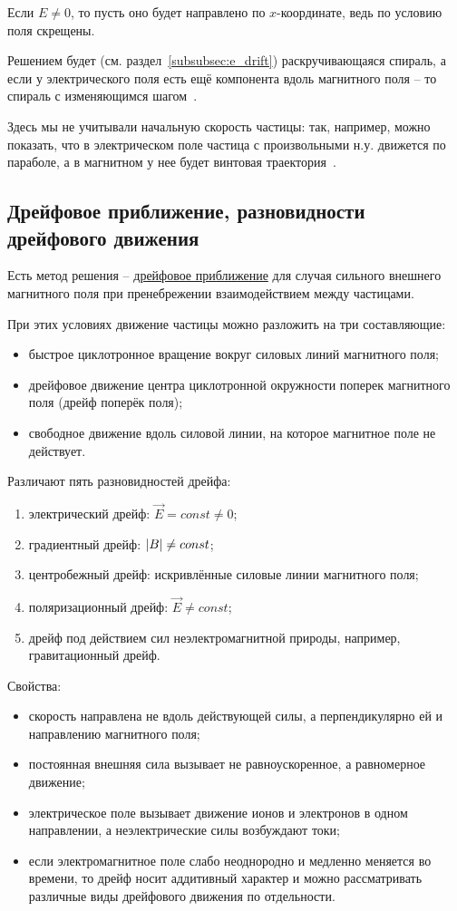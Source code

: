 \documentclass[10pt, a4paper]{article}
\begin{document}
Если $E\neq0$, то пусть оно будет направлено по $x$-координате, ведь по условию поля скрещены.

Решением будет (см. раздел~\ref{subsubsec:e_drift}) раскручивающаяся спираль, а если у электрического поля есть ещё компонента вдоль магнитного поля -- то спираль с изменяющимся шагом~\cite{chen}.

Здесь мы не учитывали начальную скорость частицы: так, например, можно показать, что в электрическом поле частица с произвольными н.у. движется по параболе, а в магнитном у нее будет винтовая траектория~\cite{landau2}. 	

\subsection{Дрейфовое приближение, разновидности дрейфового движения}

Есть метод решения -- \uline{дрейфовое приближение} для случая сильного внешнего магнитного поля при пренебрежении взаимодействием между частицами.

При этих условиях движение частицы можно разложить на три составляющие: 
\begin{itemize}
	\item быстрое циклотронное вращение вокруг силовых линий магнитного поля;
	\item дрейфовое движение центра циклотронной окружности поперек магнитного поля (дрейф поперёк поля);
	\item свободное движение вдоль силовой линии, на которое магнитное поле не действует.
\end{itemize}

Различают пять разновидностей дрейфа:
\begin{enumerate}
	\item электрический дрейф: $\vec{E}=const\neq0$;
	\item градиентный дрейф: $\abs{B}\neq const$; 
	\item центробежный дрейф: искривлённые силовые линии магнитного поля;
	\item поляризационный дрейф: $\vec{E}\neq const$;
	\item дрейф под действием сил неэлектромагнитной природы, например, гравитационный дрейф.
\end{enumerate}

Свойства:
\begin{itemize}
	\item скорость направлена не вдоль действующей силы, а перпендикулярно ей и направлению магнитного поля;
	\item постоянная внешняя сила вызывает не равноускоренное, а равномерное движение;
	\item электрическое поле вызывает движение ионов и электронов в одном направлении, а неэлектрические силы возбуждают токи;
	\item если электромагнитное поле слабо неоднородно и медленно меняется во времени, то дрейф носит аддитивный характер и можно рассматривать различные виды дрейфового движения по отдельности.
\end{itemize}
\end{document}
